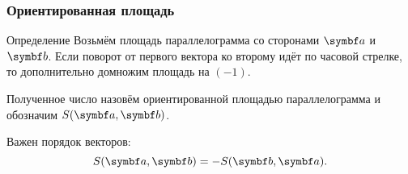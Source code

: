 \begin{frame}
    \frametitle{Ориентированная площадь}


    \begin{block}{Определение}
        Возьмём площадь параллелограмма со сторонами $\ba$ и $\bb$.
        Если поворот от первого вектора ко второму идёт по часовой стрелке, то дополнительно домножим площадь на $(-1)$.

        Полученное число назовём \alert{ориентированной площадью} параллелограмма и обозначим $S(\ba, \bb)$.    
    \end{block}

    \pause

    Важен порядок векторов: 
    \[
        S(\ba, \bb) = - S(\bb, \ba).  
    \]
    
\end{frame}

